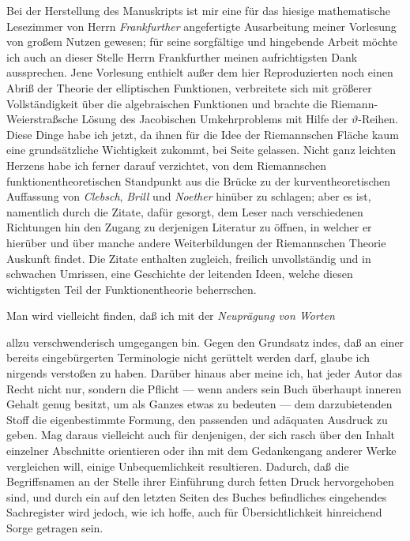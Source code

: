 \documentclass{article}
\begin{document}
Bei der Herstellung des Manuskripts ist mir eine für das hiesige mathematische Lesezimmer von Herrn \emph{Frankfurther} angefertigte Ausarbeitung meiner Vorlesung von großem Nutzen gewesen; für seine sorgfältige und hingebende Arbeit möchte ich auch an dieser Stelle Herrn Frankfurther meinen aufrichtigsten Dank aussprechen. Jene Vorlesung enthielt außer dem hier Reproduzierten noch einen Abriß der Theorie der elliptischen Funktionen, verbreitete sich mit größerer Vollständigkeit über die algebraischen Funktionen und brachte die Riemann-Weierstraßsche Lösung des Jacobischen Umkehrproblems mit Hilfe der $\vartheta$-Reihen. Diese Dinge habe ich jetzt, da ihnen für die Idee der Riemannschen Fläche kaum eine grundsätzliche Wichtigkeit zukommt, bei Seite gelassen. Nicht ganz leichten Herzens habe ich ferner darauf verzichtet, von dem Riemannschen funktionentheoretischen Standpunkt aus die Brücke zu der kurventheoretischen Auffassung von \emph{Clebsch}, \emph{Brill} und \emph{Noether} hinüber zu schlagen; aber es ist, namentlich durch die Zitate, dafür gesorgt, dem Leser nach verschiedenen Richtungen hin den Zugang zu derjenigen Literatur zu öffnen, in welcher er hierüber und über manche andere Weiterbildungen der Riemannschen Theorie Auskunft findet. Die Zitate enthalten zugleich, freilich unvollständig und in schwachen Umrissen, eine Geschichte der leitenden Ideen, welche diesen wichtigsten Teil der Funktionentheorie beherrschen.

Man wird vielleicht finden, daß ich mit der \emph{Neuprägung von Worten}

allzu verschwenderisch umgegangen bin. Gegen den Grundsatz indes, daß an einer bereits eingebürgerten Terminologie nicht gerüttelt werden darf, glaube ich nirgends verstoßen zu haben. Darüber hinaus aber meine ich, hat jeder Autor das Recht nicht nur, sondern die Pflicht --- wenn anders sein Buch überhaupt inneren Gehalt genug besitzt, um als Ganzes etwas zu bedeuten --- dem darzubietenden Stoff die eigenbestimmte Formung, den passenden und adäquaten Ausdruck zu geben. Mag daraus vielleicht auch für denjenigen, der sich rasch über den Inhalt einzelner Abschnitte orientieren oder ihn mit dem Gedankengang anderer Werke vergleichen will, einige Unbequemlichkeit resultieren. Dadurch, daß die Begriffsnamen an der Stelle ihrer Einführung durch fetten Druck hervorgehoben sind, und durch ein auf den letzten Seiten des Buches befindliches eingehendes Sachregister wird jedoch, wie ich hoffe, auch für Übersichtlichkeit hinreichend Sorge getragen sein.
\end{document}
